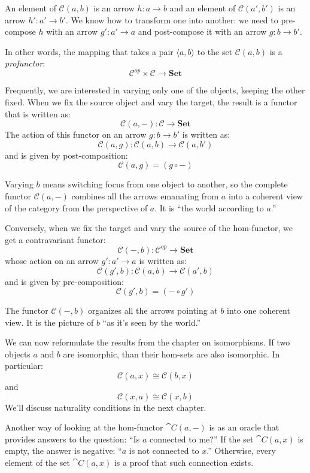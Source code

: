 \documentclass[DaoFP]{subfiles}
\begin{document}
An element of $\mathcal{C}(a, b)$ is an arrow $h \colon a \to b$ and an element of $\mathcal{C}(a', b')$ is an arrow $h' \colon a' \to b'$. We know how to transform one into another: we need to pre-compose $h$ with an arrow $g' \colon a' \to a$ and post-compose it with an arrow $g \colon b \to b'$. 

In other words, the mapping that takes a pair $\langle a, b \rangle$ to the set $\mathcal{C}(a, b)$ is a \emph{profunctor}:
\[ \mathcal{C}^{op} \times \mathcal{C} \to \mathbf{Set} \]

Frequently, we are interested in varying only one of the objects, keeping the other fixed. When we fix the source object and vary the target, the result is a functor  that is written as:
\[ \mathcal{C}(a, -) \colon \mathcal{C} \to \mathbf{Set} \]
The action of this functor on an arrow $g \colon b \to b'$ is written as:
\[ \mathcal{C}(a, g) \colon \mathcal{C}(a, b) \to \mathcal{C}(a, b') \]
and is given by post-composition:
\[\mathcal{C}(a, g) = (g \circ -) \]

Varying $b$ means switching focus from one object to another, so the complete functor $\mathcal{C}(a, -)$ combines all the arrows emanating from $a$ into a coherent view of the category from the perspective of $a$. It is ``the world according to $a$.''

Conversely, when we fix the target and vary the source of the hom-functor, we get a contravariant functor:
\[ \mathcal{C}(-, b) \colon \mathcal{C}^{op} \to \mathbf{Set} \]
whose action on an arrow $g' \colon a' \to a$ is written as:
\[ \mathcal{C}(g', b) \colon \mathcal{C}(a, b) \to \mathcal{C}(a', b) \]
and is given by pre-composition:
\[\mathcal{C}(g', b) = (- \circ g') \]

The functor $\mathcal{C}(-, b)$ organizes all the arrows pointing at $b$ into one coherent view. It is the picture of $b$ ``as it's seen by the world.''

We can now reformulate the results from the chapter on isomorphisms. If two objects $a$ and $b$ are isomorphic, than their hom-sets are also isomorphic. In particular:
\[\mathcal{C}(a, x) \cong \mathcal{C}(b, x)\]
and 
\[\mathcal{C}(x, a) \cong \mathcal{C}(x, b)\]
We'll discuss naturality conditions in the next chapter.

Another way of looking at the hom-functor $\cat C(a, -)$ is as an oracle that  provides answers to the question: ``Is $a$ connected to me?'' If the set $\cat C(a, x)$ is empty, the answer is negative: ``$a$ is not connected to $x$.'' Otherwise, every element of the set $\cat C(a, x)$ is a proof that such connection exists. 
\end{document}
